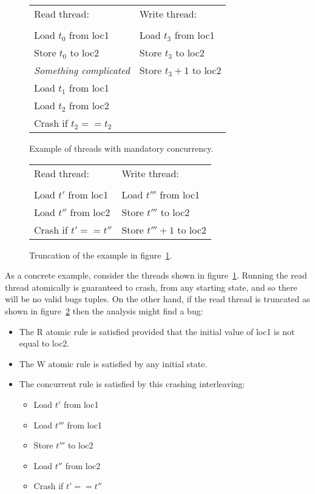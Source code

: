 \begin{figure}
\begin{tabular}{ll}
Read thread:         & Write thread: \\
\\
Load $t_0$ from loc1   & Load $t_3$ from loc1 \\
Store $t_0$ to loc2    & Store $t_3$ to loc2 \\
\textit{Something complicated} & Store $t_3 + 1$ to loc2 \\
Load $t_1$ from loc1  & \\
Load $t_2$ from loc2 & \\
Crash if $t_2 == t_2$ & \\
\end{tabular}
\caption{Example of threads with mandatory concurrency.}
\label{fig:mandatory_concurrency1}
\end{figure}

\begin{figure}
\begin{tabular}{ll}
Read thread:          & Write thread: \\
\\
Load $t'$ from loc1   & Load $t'''$ from loc1 \\
Load $t''$ from loc2  & Store $t'''$ to loc2 \\
Crash if $t' == t''$  & Store $t''' + 1$ to loc2
\end{tabular}
\caption{Truncation of the example in figure~\ref{fig:mandatory_concurrency1}.}
\label{fig:mandatory_concurrency2}
\end{figure}

As a concrete example, consider the threads shown in
figure~\ref{fig:mandatory_concurrency1}.  Running the read thread
atomically is guaranteed to crash, from any starting state, and so
there will be no valid bugs tuples.  On the other hand, if the read
thread is truncated as shown in
figure~\ref{fig:mandatory_concurrency2} then the analysis might find a
bug:

\begin{itemize}
\item
  The R atomic rule is satisfied provided that the initial value of
  loc1 is not equal to loc2.
\item
  The W atomic rule is satisfied by any initial state.
\item
  The concurrent rule is satisfied by this crashing interleaving:
  \begin{itemize}
  \item Load $t'$ from loc1
  \item Load $t'''$ from loc1
  \item Store $t'''$ to loc2
  \item Load $t''$ from loc2
  \item Crash if $t' == t''$
  \end{itemize}
\end{itemize}

